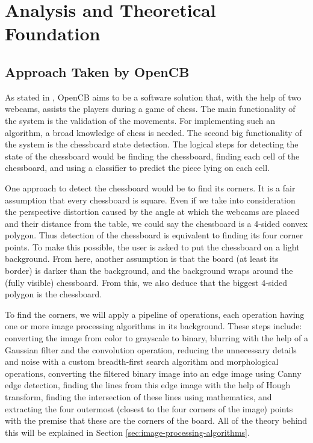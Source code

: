 \chapter{Analysis and Theoretical Foundation} \label{ch:analysis}
\pagestyle{fancy}




\section{Approach Taken by OpenCB} \label{sec:approach-taken-by-opencb}

As stated in , OpenCB aims to be a software solution that, with the help of two webcams, assists the players during a game of chess. The main functionality of the system is the validation of the movements. For implementing such an algorithm, a broad knowledge of chess is needed. The second big functionality of the system is the chessboard state detection. The logical steps for detecting the state of the chessboard would be finding the chessboard, finding each cell of the chessboard, and using a classifier to predict the piece lying on each cell.

One approach to detect the chessboard would be to find its corners. It is a fair assumption that every chessboard is square. Even if we take into consideration the perspective distortion caused by the angle at which the webcams are placed and their distance from the table, we could say the chessboard is a 4-sided convex polygon. Thus detection of the chessboard is equivalent to finding its four corner points. To make this possible, the user is asked to put the chessboard on a light background. From here, another assumption is that the board (at least its border) is darker than the background, and the background wraps around the (fully visible) chessboard. From this, we also deduce that the biggest 4-sided polygon is the chessboard.

To find the corners, we will apply a pipeline of operations, each operation having one or more image processing algorithms in its background. These steps include: converting the image from color to grayscale to binary, blurring with the help of a Gaussian filter and the convolution operation, reducing the unnecessary details and noise with a custom breadth-first search algorithm and morphological operations, converting the filtered binary image into an edge image using Canny edge detection, finding the lines from this edge image with the help of Hough transform, finding the intersection of these lines using mathematics, and extracting the four outermost (closest to the four corners of the image) points with the premise that these are the corners of the board. All of the theory behind this will be explained in Section \ref{sec:image-processing-algorithms}.

